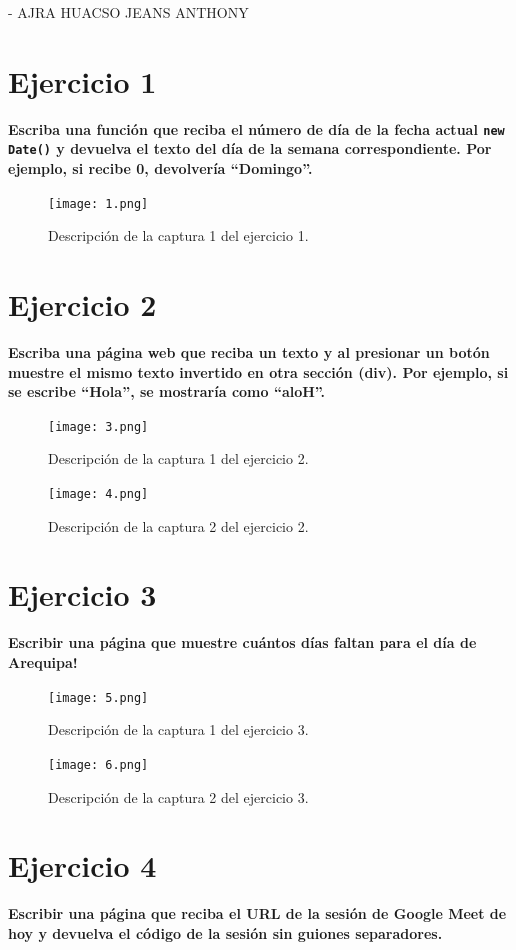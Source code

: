 \documentclass{article}
\begin{document}
\item - AJRA HUACSO JEANS ANTHONY




\section{Ejercicio 1}
\textbf{Escriba una función que reciba el número de día de la fecha actual \texttt{new Date()} y devuelva el texto del día de la semana correspondiente. Por ejemplo, si recibe 0, devolvería “Domingo”.}

\begin{figure}[htbp]
    \centering
    \texttt{[image: 1.png]}
    \caption{Descripción de la captura 1 del ejercicio 1.}
\end{figure}

\section{Ejercicio 2}
\textbf{Escriba una página web que reciba un texto y al presionar un botón muestre el mismo texto invertido en otra sección (div). Por ejemplo, si se escribe “Hola”, se mostraría como “aloH”.}

\begin{figure}[htbp]
    \centering
    \texttt{[image: 3.png]}
    \caption{Descripción de la captura 1 del ejercicio 2.}
\end{figure}
\begin{figure}[htbp]
    \centering
    \texttt{[image: 4.png]}
    \caption{Descripción de la captura 2 del ejercicio 2.}
\end{figure}

\section{Ejercicio 3}
\textbf{Escribir una página que muestre cuántos días faltan para el día de Arequipa!}

\begin{figure}[htbp]
    \centering
    \texttt{[image: 5.png]}
    \caption{Descripción de la captura 1 del ejercicio 3.}
\end{figure}
\begin{figure}[htbp]
    \centering
    \texttt{[image: 6.png]}
    \caption{Descripción de la captura 2 del ejercicio 3.}
\end{figure}

\section{Ejercicio 4}
\textbf{Escribir una página que reciba el URL de la sesión de Google Meet de hoy y devuelva el código de la sesión sin guiones separadores.}
\end{document}
